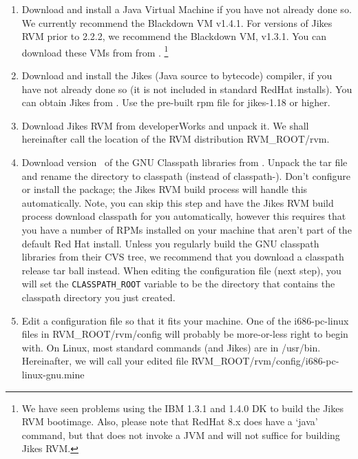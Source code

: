 \begin{enumerate}

\item Download and install a Java Virtual Machine if you have not
already done so.  We currently recommend the Blackdown VM v1.4.1. 
For versions of Jikes RVM prior to 2.2.2, we recommend
the Blackdown VM, v1.3.1. You can download these VMs from 
from \xlink{{\tt \BlackdownURL}} {\BlackdownURL}. 
\footnote{We have seen problems using the IBM 1.3.1 and 1.4.0
DK to build the Jikes RVM bootimage. Also, please note that RedHat 8.x
does have a `java' command, but that does not invoke a JVM and will
not suffice for building Jikes RVM.}

\item Download and install the Jikes (Java source to bytecode)
compiler, if you have not already 
done so (it is not included in standard RedHat installs).  You can
obtain Jikes from .
Use the pre-built rpm file for jikes-1.18 or higher.

\item Download Jikes RVM from developerWorks and unpack it.  We shall
hereinafter call the location of the RVM distribution RVM\_ROOT/rvm.

\item Download version \classpathversion\ of the GNU Classpath
libraries from 
\xlink{{\tt \classpathftp}}{\classpathftp}. 
Unpack the tar file and rename the
directory to classpath (instead of classpath-\classpathversion). Don't
configure or install the package; the Jikes RVM build process will
handle this automatically.  Note, you can skip this step and have the
Jikes RVM build process download classpath for you automatically,
however this requires that you have a number of RPMs installed
on your machine that aren't part of the default Red Hat install.
Unless you regularly build the GNU classpath libraries from their CVS
tree, we recommend that you download a classpath release tar ball
instead. When editing the configuration file (next step), you will set
the {\tt CLASSPATH\_ROOT} variable to be the directory that contains the
classpath directory you just created.  

\item Edit a configuration file so that it fits your machine.  One of
the i686-pc-linux files in RVM\_ROOT/rvm/config will probably be
more-or-less right to begin with.  On Linux, most standard commands
(and Jikes) are in /usr/bin.  Hereinafter, we will call your edited
file RVM\_ROOT/rvm/config/i686-pc-linux-gnu.mine


\end{enumerate}
